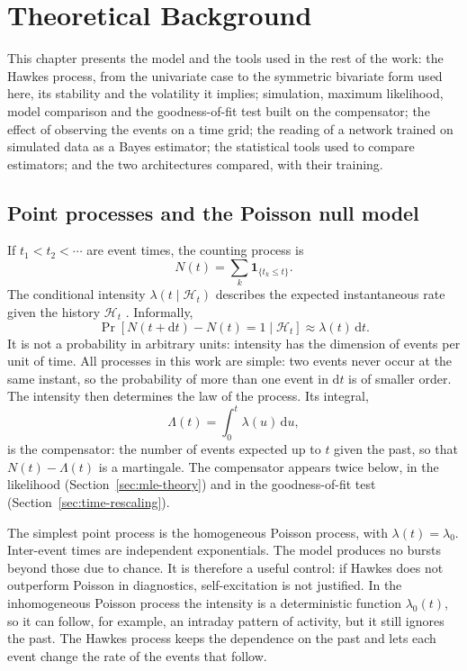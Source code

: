 \chapter{Theoretical Background}

This chapter presents the model and the tools used in the rest of the work: the Hawkes
process, from the univariate case to the symmetric bivariate form used here, its stability
and the volatility it implies; simulation, maximum likelihood, model comparison and the
goodness-of-fit test built on the compensator; the effect of observing the events on a time
grid; the reading of a network trained on simulated data as a Bayes estimator; the statistical
tools used to compare estimators; and the two architectures compared, with their training.

\section{Point processes and the Poisson null model}

If \(t_1<t_2<\cdots\) are event times, the counting process is
\[
  N(t)=\sum_k\mathbf{1}_{\{t_k\le t\}}.
\]
The conditional intensity \(\lambda(t\mid\mathcal H_t)\) describes the expected
instantaneous rate given the history \(\mathcal H_t\) \citep{daley2003}. Informally,
\[
  \Pr[N(t+\mathrm dt)-N(t)=1\mid\mathcal H_t]
  \approx \lambda(t)\,\mathrm dt.
\]
It is not a probability in arbitrary units: intensity has the dimension of events per
unit of time. All processes in this work are simple: two events never occur at the same
instant, so the probability of more than one event in \(\mathrm dt\) is of smaller order.
The intensity then determines the law of the process. Its integral,
\[
  \Lambda(t)=\int_0^t\lambda(u)\,\mathrm du,
\]
is the compensator: the number of events expected up to \(t\) given the past, so that
\(N(t)-\Lambda(t)\) is a martingale. The compensator appears twice below, in the likelihood
(Section~\ref{sec:mle-theory}) and in the goodness-of-fit test
(Section~\ref{sec:time-rescaling}).

The simplest point process is the homogeneous Poisson process, with \(\lambda(t)=\lambda_0\). Inter-event times are
independent exponentials. The model produces no bursts beyond those due to chance. It
is therefore a useful control: if Hawkes does not outperform Poisson in diagnostics,
self-excitation is not justified. In the inhomogeneous Poisson process the intensity is a
deterministic function \(\lambda_0(t)\), so it can follow, for example, an intraday pattern of
activity, but it still ignores the past. The Hawkes process keeps the dependence on the past
and lets each event change the rate of the events that follow.

